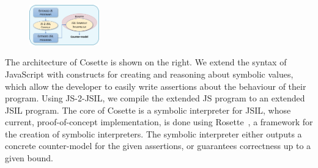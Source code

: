 \documentclass[sigconf, anonymous, review]{acmart}
\def\jsinline{\lstinline[language=JavaScript, basicstyle=\small]}
\newcommand{\jsil}{JSIL\xspace}
\newcommand{\JSComp}{JS-2-JSIL\xspace}
\newcommand{\cosette}{Cosette\xspace}
\newcommand{\myparagraph}[1]{\smallskip\noindent {\bf #1.}\hspace{1pt}}
\newcommand{\pmaxinline}[1]{ {\color{blue} *** PM : #1 ***} }
\begin{document}
\begin{figure}
\vspace*{-0.4cm}
\hspace*{-0.67cm}
\centering
\includegraphics[width=0.27\textwidth]{figures/jilette_blue.png}
\vspace*{-0.55cm}
\label{fig:jilette:diagram}
\end{figure}
 
\myparagraph{Architecture} The architecture of \cosette is shown on the right. We extend the syntax of JavaScript with constructs for creating and reasoning about symbolic values, which allow the developer to easily write assertions about the behaviour of their program. Using \JSComp, we compile the extended JS program to an extended \jsil program. The core of \cosette is a symbolic interpreter for
\jsil, whose current, proof-of-concept implementation, is done using Rosette~\cite{Rosette2,Rosette1}, a framework for the creation of symbolic interpreters. The symbolic interpreter either outputs a concrete counter-model for the given assertions, or guarantees correctness up to a given bound. %

\end{document}
